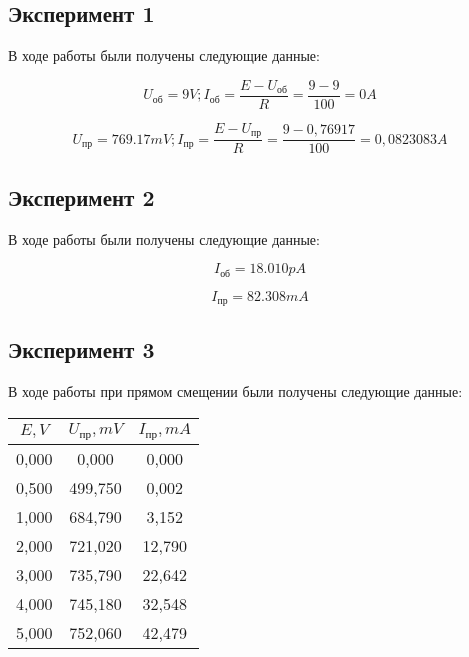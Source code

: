 \documentclass[12pt]{article}
\begin{document}
    \subsection*{Эксперимент 1}

    В ходе работы были получены следующие данные:

    $$ U_{\text{об}} = 9V; I_{\text{об}} = \frac{E - U_{\text{об}}}{R} = \frac{9 - 9}{100} = 0A$$

    $$ U_{\text{пр}} = 769.17mV; I_{\text{пр}} = \frac{E - U_{\text{пр}}}{R} = \frac{9 - 0,76917}{100} = 0,0823083A$$

    \subsection*{Эксперимент 2}

    В ходе работы были получены следующие данные:

    $$ I_{\text{об}} = 18.010pA$$

    $$ I_{\text{пр}} = 82.308mA$$

    \subsection*{Эксперимент 3}

    В ходе работы при прямом смещении были получены следующие данные:

    \begin{table}[ht]
        \centering
        \begin{tabular}{|c|c|c|}
            \hline
            $E, V$ & $U_{\text{пр}}, mV$ & $I_{\text{пр}}, mA$ \\
            \hline
            0,000 & 0,000 & 0,000 \\
            \hline
            0,500 & 499,750 & 0,002 \\
            \hline
            1,000 & 684,790 & 3,152 \\
            \hline
            2,000 & 721,020 & 12,790 \\
            \hline
            3,000 & 735,790 & 22,642 \\
            \hline
            4,000 & 745,180 & 32,548 \\
            \hline
            5,000 & 752,060 & 42,479 \\
            \hline
        \end{tabular}
    \end{table}
\end{document}
